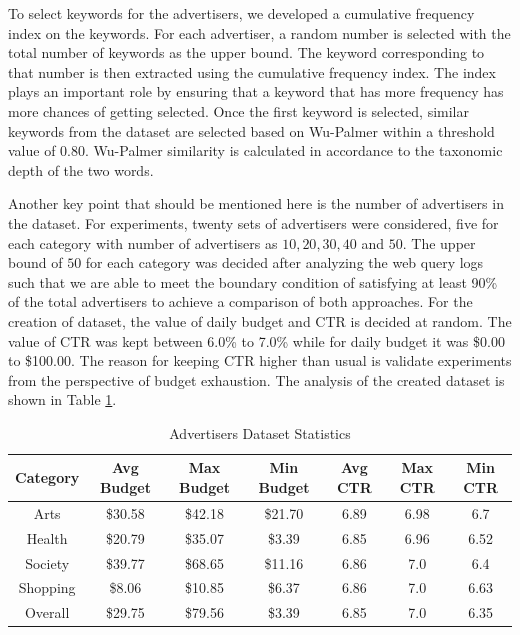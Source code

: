 To select keywords for the advertisers, we developed  a cumulative frequency index on the keywords. For each advertiser, a random number is selected with the total number of keywords as the upper bound. The keyword corresponding to that number is then extracted using the cumulative frequency index. The index plays an important role by ensuring that a keyword that has more frequency has more chances of getting selected. Once the first keyword is selected, similar keywords from the dataset are selected based on Wu-Palmer \cite{wu1994verbs} within a threshold value of $0.80$. Wu-Palmer similarity is calculated in accordance to the taxonomic depth of the two words. \par

Another key point that should be mentioned here is the number of advertisers in the dataset. For  experiments, twenty sets of advertisers were considered, five for each category with number of advertisers as $10, 20, 30, 40$ and $50$. The upper bound of $50$ for each category was decided after analyzing the web query logs such that we are able to meet the boundary condition of satisfying at least 90\% of the total advertisers to achieve a comparison of both approaches. For the creation of dataset, the value of daily budget and CTR is decided at random. The value of CTR was kept between 6.0\% to 7.0\% while for daily budget it was \$0.00 to \$100.00. The reason for keeping CTR higher than usual is validate experiments from the perspective of budget exhaustion. The analysis of the created dataset is shown in Table \ref{table:AdSetStats}.

\begin{table}
\centering
\caption{Advertisers Dataset Statistics \label{table:AdSetStats}}
\normalsize

\begin{tabular}{|c|c|c|c|c|c|c|} \hline
Category & Avg Budget & Max Budget & Min Budget & Avg CTR & Max CTR & Min CTR	\\ \hline
Arts & \$30.58 & \$42.18 & \$21.70 & 6.89 & 6.98 & 6.7 \\ \hline
Health & \$20.79 & \$35.07 & \$3.39 & 6.85 & 6.96 & 6.52 \\ \hline
Society & \$39.77 & \$68.65 & \$11.16 & 6.86 & 7.0 & 6.4 \\ \hline
Shopping & \$8.06 & \$10.85 & \$6.37 & 6.86 & 7.0 & 6.63  \\ \hline
Overall & \$29.75 & \$79.56 & \$3.39 & 6.85 & 7.0 & 6.35 \\ \hline
\end{tabular}

\end{table}


